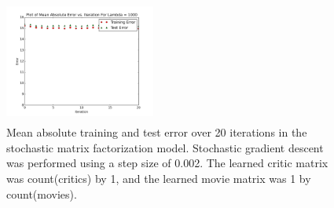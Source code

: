 \documentclass[10.5pt]{article}
\newcommand{\factwidth}{0.44}
\newcommand{\factheight}{1.6in}
\begin{document}
\begin{figure}[H]
\includegraphics[width=0\factwidth\textwidth,height=\factheight]{matrix_plots/test-i40d1l1000.png}
\caption{Mean absolute training and test error over 20 iterations in the stochastic matrix factorization model. Stochastic gradient descent was performed using a step size of 0.002. The learned critic matrix was count(critics) by 1, and the learned movie matrix was 1 by count(movies).}
\label{fig:fac-d1}
\end{figure}
\end{document}
